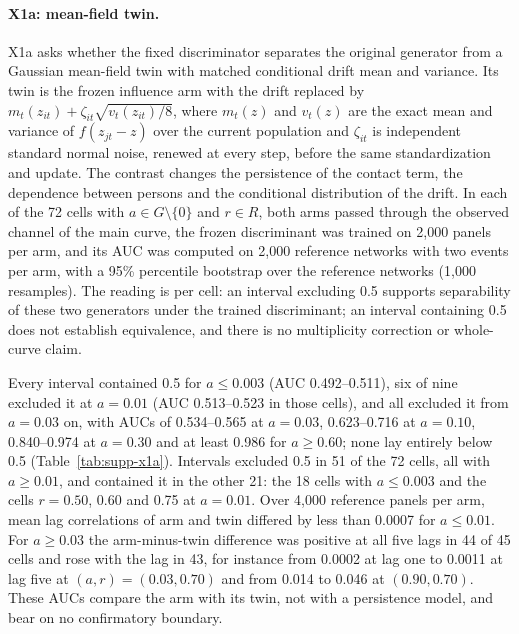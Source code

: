 \paragraph{X1a: mean-field twin.}
X1a asks whether the fixed discriminator separates the original generator from a Gaussian mean-field twin with matched conditional drift mean and variance. %
Its twin is the frozen influence arm with the drift replaced by $m_t(z_{it})+\zeta_{it}\sqrt{v_t(z_{it})/8}$, where $m_t(z)$ and $v_t(z)$ are the exact mean and variance of $f(z_{jt}-z)$ over the current population and $\zeta_{it}$ is independent standard normal noise, renewed at every step, before the same standardization and update. %
The contrast changes the persistence of the contact term, the dependence between persons and the conditional distribution of the drift. %
In each of the 72 cells with $a\in G\setminus\{0\}$ and $r\in R$, both arms passed through the observed channel of the main curve, the frozen discriminant was trained on 2,000 panels per arm, and its AUC was computed on 2,000 reference networks with two events per arm, with a 95\% percentile bootstrap over the reference networks (1,000 resamples). %
The reading is per cell: an interval excluding 0.5 supports separability of these two generators under the trained discriminant; an interval containing 0.5 does not establish equivalence, and there is no multiplicity correction or whole-curve claim. %

Every interval contained 0.5 for $a\leq0.003$ (AUC 0.492--0.511), six of nine excluded it at $a=0.01$ (AUC 0.513--0.523 in those cells), and all excluded it from $a=0.03$ on, with AUCs of 0.534--0.565 at $a=0.03$, 0.623--0.716 at $a=0.10$, 0.840--0.974 at $a=0.30$ and at least 0.986 for $a\geq0.60$; none lay entirely below 0.5 (Table~\ref{tab:supp-x1a}). %
Intervals excluded 0.5 in 51 of the 72 cells, all with $a\geq0.01$, and contained it in the other 21: the 18 cells with $a\leq0.003$ and the cells $r=0.50$, 0.60 and 0.75 at $a=0.01$. %
Over 4,000 reference panels per arm, mean lag correlations of arm and twin differed by less than 0.0007 for $a\leq0.01$. %
For $a\geq0.03$ the arm-minus-twin difference was positive at all five lags in 44 of 45 cells and rose with the lag in 43, for instance from 0.0002 at lag one to 0.0011 at lag five at $(a,r)=(0.03,0.70)$ and from 0.014 to 0.046 at $(0.90,0.70)$. %
These AUCs compare the arm with its twin, not with a persistence model, and bear on no confirmatory boundary. %

